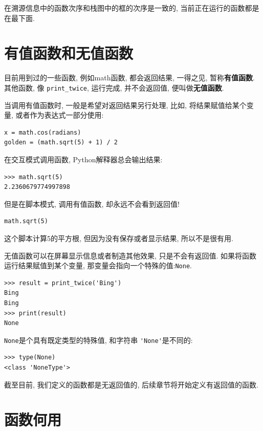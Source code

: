 \documentclass[10pt]{book}
\begin{document}
在溯源信息中的函数次序和栈图中的框的次序是一致的, 
当前正在运行的函数都是在最下面. 

\section{有值函数和无值函数}

目前用到过的一些函数, 例如math函数, 都会返回结果, 
一得之见, 暂称{\bf 有值函数}. 其他函数, 像 \verb"print_twice", 
运行完成, 并不会返回值, 便叫做{\bf 无值函数}. 

当调用有值函数时, 一般是希望对返回结果另行处理, 比如, 
将结果赋值给某个变量, 或者作为表达式一部分使用:

\begin{verbatim}
x = math.cos(radians)
golden = (math.sqrt(5) + 1) / 2
\end{verbatim}
%
在交互模式调用函数, Python解释器总会输出结果:

\begin{verbatim}
>>> math.sqrt(5)
2.2360679774997898
\end{verbatim}
%
但是在脚本模式, 调用有值函数, 却永远不会看到返回值!

\begin{verbatim}
math.sqrt(5)
\end{verbatim}
%
这个脚本计算5的平方根, 但因为没有保存或者显示结果, 所以不是很有用. 

无值函数可以在屏幕显示信息或者制造其他效果, 
只是不会有返回值. 如果将函数运行结果赋值到某个变量, 
那变量会指向一个特殊的值:{\tt None}.

\begin{verbatim}
>>> result = print_twice('Bing')
Bing
Bing
>>> print(result)
None
\end{verbatim}
%
{\tt None}是个具有既定类型的特殊值, 和字符串 \verb"'None'"是不同的:

\begin{verbatim}
>>> type(None)
<class 'NoneType'>
\end{verbatim}
%
截至目前, 我们定义的函数都是无返回值的, 
后续章节将开始定义有返回值的函数. 


\section{函数何用}
\end{document}
